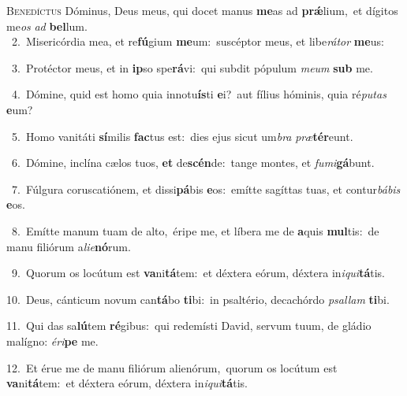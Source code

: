 \lettrine{\initial\textcolor{\initialcolor}{B}}{enedíctus} Dóminus, Deus meus, qui docet manus \textbf{me}\-as ad \textbf{prǽ}\-lium,~\star et dígitos me\textit{os} \textit{ad} \textbf{bel}\-lum.\\
{\numbfont\textcolor{\numbcolor}{~2.}}~Misericórdia mea, et re\-\textbf{fú}\-gium \textbf{me}\-um:~\star suscéptor meus, et libe\-\textit{rá}\-\textit{tor} \textbf{me}\-us:\par
{\numbfont\textcolor{\numbcolor}{~3.}}~Protéctor meus, et in \textbf{ip}\-so spe\-\textbf{rá}\-vi:~\star qui subdit pópulum \textit{me}\-\textit{um} \textbf{sub} me.\par
{\numbfont\textcolor{\numbcolor}{~4.}}~Dómine, quid est homo quia innotu\-\textbf{ís}\-ti \textbf{e}\-i?~\star aut fílius hóminis, quia ré\-\textit{pu}\-\textit{tas} \textbf{e}\-um?\par
{\numbfont\textcolor{\numbcolor}{~5.}}~Homo vanitáti \textbf{sí}\-milis \textbf{fac}\-tus est:~\star dies ejus sicut um\textit{bra} \textit{præ}\-\textbf{tér}eunt.\par
{\numbfont\textcolor{\numbcolor}{~6.}}~Dómine, inclína cælos tuos, \textbf{et} de\-\textbf{scén}\-de:~\star tange montes, et \textit{fu}\-\textit{mi}\textbf{gá}bunt.\par
{\numbfont\textcolor{\numbcolor}{~7.}}~Fúlgura coruscatiónem, et dissi\-\textbf{pá}\-bis \textbf{e}\-os:~\star emítte sagíttas tuas, et contur\-\textit{bá}\-\textit{bis} \textbf{e}\-os.\par
{\numbfont\textcolor{\numbcolor}{~8.}}~Emítte manum tuam de alto,~\dagger éripe me, et líbera me de \textbf{a}\-quis \textbf{mul}\-tis:~\star de manu filiórum a\-\textit{li}\-\textit{e}\textbf{nó}rum.\par
{\numbfont\textcolor{\numbcolor}{~9.}}~Quorum os locútum est \textbf{va}\-ni\-\textbf{tá}\-tem:~\star et déxtera eórum, déxtera in\-\textit{i}\-\textit{qui}\textbf{tá}tis.\par
{\numbfont\textcolor{\numbcolor}{10.}}~Deus, cánticum novum can\-\textbf{tá}\-bo \textbf{ti}\-bi:~\star in psaltério, decachórdo \textit{psal}\-\textit{lam} \textbf{ti}\-bi.\par
{\numbfont\textcolor{\numbcolor}{11.}}~Qui das sa\-\textbf{lú}\-tem \textbf{ré}\-gibus:~\star qui redemísti David, servum tuum, de gládio malígno: \textit{é}\-\textit{ri}\textbf{pe} me.\par
{\numbfont\textcolor{\numbcolor}{12.}}~Et érue me de manu filiórum alienórum,~\dagger quorum os locútum est \textbf{va}\-ni\-\textbf{tá}\-tem:~\star et déxtera eórum, déxtera in\-\textit{i}\-\textit{qui}\textbf{tá}tis.\par
